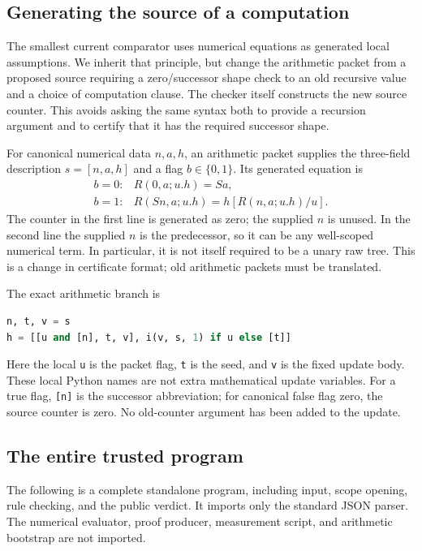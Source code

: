 \subsection{Generating the source of a computation}

The smallest current comparator uses numerical equations as generated
local assumptions. We inherit that principle, but change the arithmetic
packet from a proposed source requiring a zero/successor shape check to
an old recursive value and a choice of computation clause. The checker
itself constructs the new source counter. This avoids asking the same
syntax both to provide a recursion argument and to certify that it has
the required successor shape.

For canonical numerical data $n,a,h$, an arithmetic packet supplies the
three-field description $s=[n,a,h]$ and a flag $b\in\{0,1\}$. Its generated
equation is
\[
\begin{array}{ll}
b=0:&R(0,a;u.h)=Sa,\\[2pt]
b=1:&R(Sn,a;u.h)=h[R(n,a;u.h)/u].
\end{array}
\]
The counter in the first line is generated as zero; the supplied $n$ is
unused. In the second line the supplied $n$ is the predecessor, so it can
be any well-scoped numerical term. In particular, it is not itself
required to be a unary raw tree. This is a change in certificate format;
old arithmetic packets must be translated.

The exact arithmetic branch is
\begin{lstlisting}[language=Python]
n, t, v = s
h = [[u and [n], t, v], i(v, s, 1) if u else [t]]
\end{lstlisting}
Here the local \texttt{u} is the packet flag, \texttt{t} is the seed, and
\texttt{v} is the fixed update body. These local Python names are not
extra mathematical update variables. For a true flag, \texttt{[n]} is
the successor abbreviation; for canonical false flag zero, the source
counter is zero. No old-counter argument has been added to the update.

\subsection{The entire trusted program}

The following is a complete standalone program, including input,
scope opening, rule checking, and the public verdict. It imports only
the standard JSON parser. The numerical evaluator, proof producer,
measurement script, and arithmetic bootstrap are not imported.


